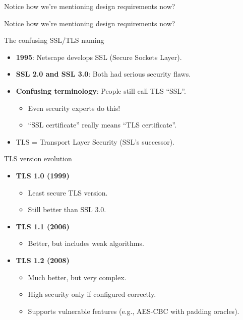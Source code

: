 \ifdefined\PRESENTATION\else\PassOptionsToClass{handout}{beamer}\fi\documentclass[aspectratio=169, lualatex]{beamer}
\begin{document}
\begin{frame}{Notice how we're mentioning design requirements now?}
\end{frame}

\begin{frame}{Notice how we're mentioning design requirements now?}
\end{frame}

\begin{frame}{The confusing SSL/TLS naming}
	\begin{itemize}
		\item \textbf{1995}: Netscape develops SSL (Secure Sockets Layer).
		\item \textbf{SSL 2.0 and SSL 3.0}: Both had serious security flaws.
		\item \textbf{Confusing terminology}: People still call TLS ``SSL''.
		      \begin{itemize}
			      \item Even security experts do this!
			      \item ``SSL certificate'' really means ``TLS certificate''.
		      \end{itemize}
		\item TLS = Transport Layer Security (SSL's successor).
	\end{itemize}
\end{frame}

\begin{frame}{TLS version evolution}
	\begin{itemize}[<+->]
		\item \textbf{TLS 1.0 (1999)}
		      \begin{itemize}
			      \item Least secure TLS version.
			      \item Still better than SSL 3.0.
		      \end{itemize}
		\item \textbf{TLS 1.1 (2006)}
		      \begin{itemize}
			      \item Better, but includes weak algorithms.
		      \end{itemize}
		\item \textbf{TLS 1.2 (2008)}
		      \begin{itemize}
			      \item Much better, but very complex.
			      \item High security only if configured correctly.
			      \item Supports vulnerable features (e.g., AES-CBC with padding oracles).
		      \end{itemize}
	\end{itemize}
\end{frame}
\end{document}
